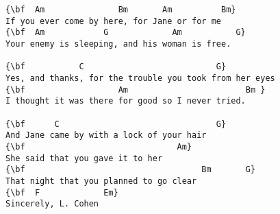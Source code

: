\documentclass[a4paper]{article}
\begin{document}
\begin{Verbatim}[commandchars=\\\{\}]
{\bf  Am               Bm       Am          Bm}
If you ever come by here, for Jane or for me
{\bf  Am            G             Am           G}
Your enemy is sleeping, and his woman is free.

{\bf           C                           G}
Yes, and thanks, for the trouble you took from her eyes
{\bf                   Am                        Bm }
I thought it was there for good so I never tried.

{\bf      C                                G}
And Jane came by with a lock of your hair
{\bf                               Am}
She said that you gave it to her
{\bf                                    Bm       G}
That night that you planned to go clear
{\bf  F             Em}
Sincerely, L. Cohen

\end{Verbatim}
\newpage
\end{document}
